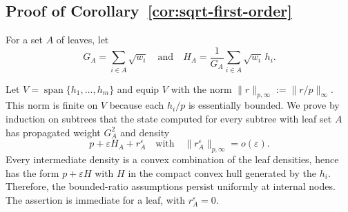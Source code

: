 \documentclass[runningheads]{llncs}
\begin{document}
\subsection*{Proof of Corollary~\ref{cor:sqrt-first-order}}

For a set $A$ of leaves, let
\begin{equation*}
  G_A=\sum_{i\in A}\sqrt{w_i}
  \quad\text{and}\quad
  H_A=\frac{1}{G_A}\sum_{i\in A}\sqrt{w_i}\,h_i.
\end{equation*}

Let $V=\operatorname{span}\{h_1,\ldots,h_m\}$ and equip $V$ with the norm
$\|r\|_{p,\infty}:=\|r/p\|_\infty$. This norm is finite on $V$ because each
$h_i/p$ is essentially bounded. We prove by induction on subtrees that the
state computed for every subtree with leaf set $A$ has propagated weight
$G_A^2$ and density
\begin{equation*}
  p+\varepsilon H_A+r_A^\varepsilon
  \quad\text{with}\quad
  \|r_A^\varepsilon\|_{p,\infty}=o(\varepsilon).
\end{equation*}
Every intermediate density is a convex combination of the leaf densities, hence
has the form $p+\varepsilon H$ with $H$ in the compact convex hull generated by
the $h_i$. Therefore, the bounded-ratio assumptions persist uniformly at internal
nodes. The assertion is immediate for a leaf, with $r_A^\varepsilon=0$.
\end{document}
